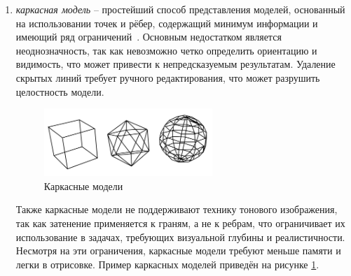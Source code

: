 \begin{enumerate}
	\item \textit{каркасная модель} -- простейший способ представления моделей, основанный на использовании точек и рёбер, содержащий минимум информации и имеющий ряд ограничений~\cite{lit1}. Основным недостатком является неоднозначность, так как невозможно четко определить ориентацию и видимость, что может привести к непредсказуемым результатам. Удаление скрытых линий требует ручного редактирования, что может разрушить целостность модели. 
	\begin{figure}[h] 
		\centering
		\includegraphics[width=0.6\textwidth]{images/carcass-models.png}
		\caption{Каркасные модели} 
		\label{fig:carcass-models} 
	\end{figure}
	Также каркасные модели не поддерживают технику тонового изображения, так как затенение применяется к граням, а не к ребрам, что ограничивает их использование в задачах, требующих визуальной глубины и реалистичности. Несмотря на эти ограничения, каркасные модели требуют меньше памяти и легки в отрисовке. Пример каркасных моделей приведён на рисунке \ref{fig:carcass-models}.
	

\end{enumerate}
